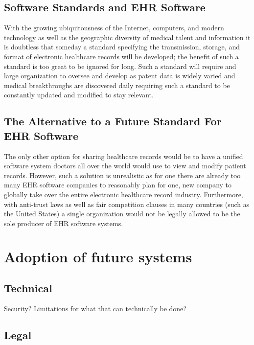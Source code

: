 \documentclass[14pt]{article}
\begin{document}
\subsection{Software Standards and EHR Software}
With the growing ubiquitousness of the Internet, computers, and modern technology as well as the geographic diversity of medical talent and information it is doubtless that someday a standard specifying the transmission, storage, and format of electronic healthcare records will be developed; the benefit of such a standard is too great to be ignored for long. Such a standard will require and large organization to oversee and develop as patent data is widely varied and medical breakthroughs are discovered daily requiring such a standard to be constantly updated and modified to stay relevant. 

\subsection{The Alternative to a Future Standard For EHR Software}
The only other option for sharing healthcare records would be to have a unified software system doctors all over the world would use to view and modify patient records. However, such a solution is unrealistic as for one there are already too many \gls{EHR} software companies to reasonably plan for one, new company to globally take over the entire electronic healthcare record industry. Furthermore, with anti-trust laws as well as fair competition clauses in many countries (such as the United States) a single organization would not be legally allowed to be the sole producer of \gls{EHR} software systems.

\newpage

\section{Adoption of future systems}


\subsection{Technical}
Security? Limitations for what that can technically be done?


\subsection{Legal}

\end{document}
